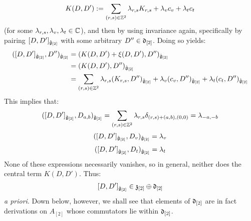\begin{remark}
\begin{enumerate}
                    $$K(D, D') := \sum_{(r, s) \in \mathbb{Z}^2} \lambda_{r, s} K_{r, s} + \lambda_v c_v + \lambda_t c_t$$
                (for some $\lambda_{r, s}, \lambda_v, \lambda_t \in \mathbb{C}$), and then by using invariance again, specifically by pairing $[D, D']_{\hat{\mathfrak{g}}_{[2]}}$ with some arbitrary $D'' \in \mathfrak{d}_{[2]}$. Doing so yields:
                    $$
                        \begin{aligned}
                            ([D, D']_{\hat{\mathfrak{g}}_{[2]}}, D'')_{\hat{\mathfrak{g}}_{[2]}} & = (K(D, D') + \xi(D, D'), D'')_{\hat{\mathfrak{g}}_{[2]}}
                            \\
                            & = (K(D, D'), D'')_{\hat{\mathfrak{g}}_{[2]}}
                            \\
                            & = \sum_{(r, s) \in \mathbb{Z}^2} \lambda_{r, s} (K_{r, s}, D'')_{\hat{\mathfrak{g}}_{[2]}} + \lambda_v (c_v, D'')_{\hat{\mathfrak{g}}_{[2]}} + \lambda_t (c_t, D'')_{\hat{\mathfrak{g}}_{[2]}}
                        \end{aligned}
                    $$
                This implies that:
                    $$([D, D']_{\hat{\mathfrak{g}}_{[2]}}, D_{a, b})_{\hat{\mathfrak{g}}_{[2]}} = \sum_{(r, s) \in \mathbb{Z}^2} \lambda_{r, s} \delta_{(r, s) + (a, b), (0, 0)} = \lambda_{-a, -b}$$
                    $$([D, D']_{\hat{\mathfrak{g}}_{[2]}}, D_v)_{\hat{\mathfrak{g}}_{[2]}} = \lambda_v$$
                    $$([D, D']_{\hat{\mathfrak{g}}_{[2]}}, D_t)_{\hat{\mathfrak{g}}_{[2]}} = \lambda_t$$
                None of these expressions necessarily vanishes, so in general, neither does the central term $K(D, D')$. Thus:
                    $$[D, D']_{\hat{\mathfrak{g}}_{[2]}} \in \mathfrak{z}_{[2]} \oplus \mathfrak{d}_{[2]}$$
                \textit{a priori}. Down below, however, we shall see that elements of $\mathfrak{d}_{[2]}$ are in fact derivations on $A_{[2]}$ whose commutators lie within $\mathfrak{d}_{[2]}$. 
            \end{enumerate}
            

\end{remark}
